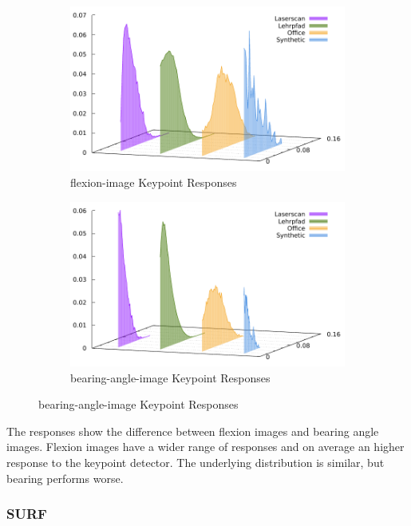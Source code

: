 \begin{figure}[H]
\begin{subfigure}[t]{0.45\linewidth}
    \includegraphics[width=\linewidth]{chapter06/results/SIFT/flexion/response.pdf}%
    \caption{\gls{flexion-image} Keypoint Responses}
\end{subfigure}\quad
\begin{subfigure}[t]{0.45\linewidth}
    \includegraphics[width=\linewidth]{chapter06/results/SIFT/bearing/response.pdf}%
    \caption{\gls{bearing-angle-image} Keypoint Responses}
\end{subfigure}
\end{figure}
The responses show the difference between flexion images and bearing angle images.
Flexion images have a wider range of responses and on average an higher response to the keypoint detector.
The underlying distribution is similar, but bearing performs worse.

\subsubsection{SURF}
